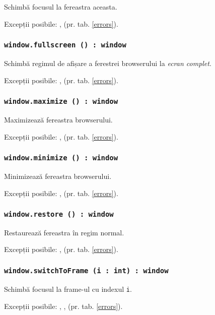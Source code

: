 Schimbă focusul la fereastra aceasta.

Excepții posibile: ,  (pr. tab. \ref{errors}).

\subsubsection{\texttt{window.fullscreen () : window}}

Schimbă regimul de afișare a ferestrei browserului la \textit{ecran complet}.

Excepții posibile: ,  (pr. tab. \ref{errors}).

\subsubsection{\texttt{window.maximize () : window}}

Maximizează fereastra browserului.

Excepții posibile: ,  (pr. tab. \ref{errors}).

\subsubsection{\texttt{window.minimize () : window}}

Minimizează fereastra browserului.

Excepții posibile: ,  (pr. tab. \ref{errors}).

\subsubsection{\texttt{window.restore () : window}}

Restaurează fereastra în regim normal.

Excepții posibile: ,  (pr. tab. \ref{errors}).

\subsubsection{\texttt{window.switchToFrame (i : int) : window}}

Schimbă focusul la frame-ul cu indexul \texttt{i}.

Excepții posibile: , ,  (pr. tab. \ref{errors}).

